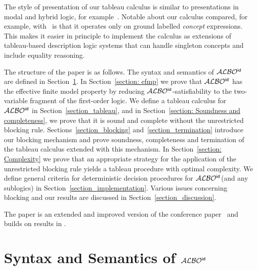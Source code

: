 \documentclass[leqno
,pdflatex
,prodmode
,acmtocl
]{acmsmall}
\newcommand{\mathcmd}[1]{\ensuremath{#1}\xspace}
\newcommand{\dlfont}{\mathcal}
\newcommand{\dl}[1]{\mathcmd{\dlfont{#1}}}
\newcommand{\idRole}{\mathcmd{\textsf{\upshape\mdseries id}}}
\newcommand{\ALBOid}{\dl{ALBO\smash[t]{\mbox{${}^{\idRole}$}}}}
\begin{document}
The style of presentation of our tableau calculus is similar to
presentations in modal and hybrid logic,
for example~\cite{Fitting-TMF+-1972,Blackburn-ILD-2000,DeNivelleSchmidtHustadt00,Schmidt06b,SchmidtOrlowskaHustadt04a,delCerroGasquet-GF+-2002}.
Notable about our calculus compared, for example,
with~\cite{Schmidt06b,SchmidtOrlowskaHustadt04a} is that it operates
only on ground labelled \emph{concept} expressions.
This makes it easier in principle to implement the calculus as extensions
of tableau-based description logic systems that can handle
singleton concepts and include equality reasoning.

The structure of the paper is as follows.
The syntax and semantics of \ALBOid are defined in
Section~\ref{section_definition_ALBO}.
In Section~\ref{section: efmp} we prove that \ALBOid has
the effective finite model property by reducing \ALBOid-satisfiability to
the two-variable fragment of the first-order logic.
We define a tableau calculus for \ALBOid in Section~\ref{section_tableau},
and in Section~\ref{section: Soundness and completeness}, we prove that it is sound and complete without the unrestricted
blocking rule.
Sections~\ref{section_blocking} and~\ref{section_termination} introduce
our blocking mechanism and prove soundness, completeness and termination of the
tableau calculus extended with this mechanism.
In Section~\ref{section: Complexity}
we prove that an appropriate strategy for the application of the unrestricted
blocking rule yields a tableau procedure with optimal complexity.
We define general criteria for deterministic decision
procedures for \ALBOid (and any sublogics) in
Section~\ref{section_implementation}.
Various issues concerning blocking and our results are discussed in
Section~\ref{section_discussion}.

The paper is an extended and improved version of the conference
paper~\cite{SchmidtTishkovsky-UTD+-2007} and builds on results in
.

\section{Syntax and Semantics of \protect\ALBOid}
\label{section_definition_ALBO}
\end{document}
